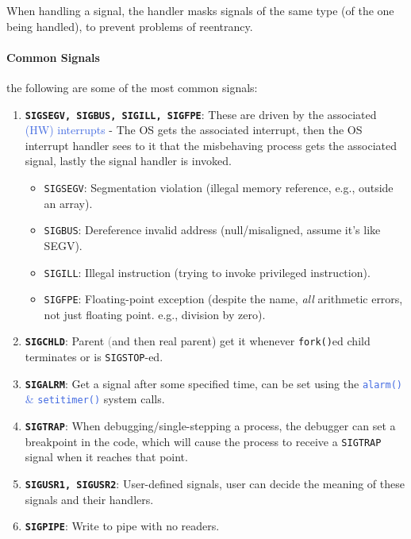 \documentclass[openany,12pt]{book}
\newcommand{\code}[1]{\texttt{#1}}
\newcommand{\blue}[1]{\textcolor{RoyalBlue}{#1}}
\newcommand{\gray}[1]{\textcolor{gray}{#1}}
\begin{document}
When handling a signal, the handler masks signals of the same type (of the one being handled), to prevent problems of reentrancy.

\paragraph{Common Signals} the following are some of the most common signals:
\begin{enumerate}
  \item \textbf{\code{SIGSEGV, SIGBUS, SIGILL, SIGFPE}}: These are driven by the associated \blue{(HW) interrupts} - The OS gets the associated interrupt, then the OS interrupt handler sees to it that the misbehaving process gets the associated signal, lastly the signal handler is invoked.
        \begin{itemize}
          \item \texttt{SIGSEGV}: Segmentation violation (illegal memory reference, e.g., outside an array).
          \item \texttt{SIGBUS}: Dereference invalid address (null/misaligned, assume it's like SEGV).
          \item \texttt{SIGILL}: Illegal instruction (trying to invoke privileged instruction).
          \item \texttt{SIGFPE}: Floating-point exception (despite the name, \textit{all} arithmetic errors, not just floating point. e.g., division by zero).
        \end{itemize}

  \item \textbf{\code{SIGCHLD}}: Parent \gray(and then real parent) get it whenever \code{fork()}ed child terminates or is \code{SIGSTOP}-ed.

  \item \textbf{\code{SIGALRM}}: Get a signal after some specified time, can be set using the \blue{\code{alarm()} \& \code{setitimer()}} system calls.

  \item \textbf{\code{SIGTRAP}}: When debugging/single-stepping a process, the debugger can set a breakpoint in the code, which will cause the process to receive a \texttt{SIGTRAP} signal when it reaches that point.

  \item \textbf{\code{SIGUSR1, SIGUSR2}}: User-defined signals, user can decide the meaning of these signals and their handlers.

  \item \textbf{\code{SIGPIPE}}: Write to pipe with no readers.


\end{enumerate}
\end{document}
